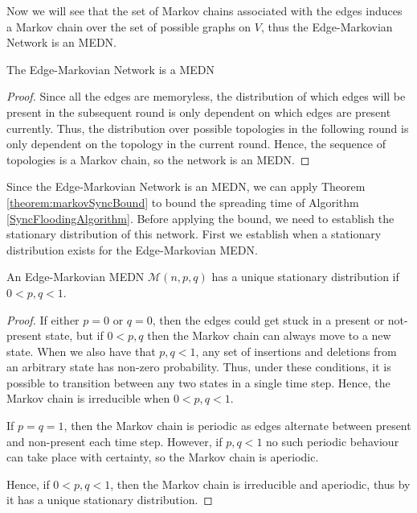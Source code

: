 Now we will see that the set of Markov chains associated with the edges induces a Markov chain over the set of possible graphs on $V$, thus the Edge-Markovian Network is an MEDN.


\begin{lemma}
	The Edge-Markovian Network is a MEDN
\end{lemma}

\begin{proof}
	Since all the edges are memoryless, the distribution of which edges will be present in the subsequent round is only dependent on which edges are present currently. %
	Thus, the distribution over possible topologies in the following round is only dependent on the topology in the current round.
	Hence, the sequence of topologies is a Markov chain, so the network is an MEDN.
\end{proof}



Since the Edge-Markovian Network is an MEDN, we can apply Theorem \ref{theorem:markovSyncBound} to bound the spreading time of Algorithm \ref{SyncFloodingAlgorithm}. Before applying the bound, we need to establish the stationary distribution of this network. First we establish when a stationary distribution exists for the Edge-Markovian MEDN.

\begin{lemma}
	An Edge-Markovian MEDN $\mathcal{M}(n, p, q)$ has a unique stationary distribution if $0 < p, q < 1$.
\end{lemma}

\begin{proof}
	If either $p=0$ or $q=0$, then the edges could get stuck in a present or not-present state, but if $0 < p, q$ then the Markov chain can always move to a new state. When we also have that $p, q < 1$, any set of insertions and deletions from an arbitrary state has non-zero probability. Thus, under these conditions, it is possible to transition between any two states in a single time step. Hence, the Markov chain is irreducible when $0 < p, q < 1$. 

	If $p=q=1$, then the Markov chain is periodic as edges alternate between present and non-present each time step. However, if $p, q < 1$ no such periodic behaviour can take place with certainty, so the Markov chain is aperiodic.

	Hence, if $0 < p, q < 1$, then the Markov chain is irreducible and aperiodic, thus by %
	it has a unique stationary distribution.
\end{proof}

